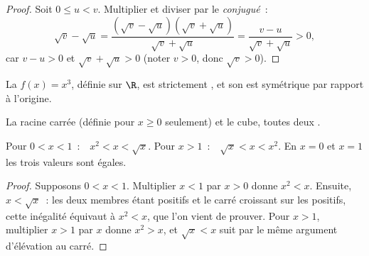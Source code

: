 \begin{proof}
Soit $0 \leq u < v$. Multiplier et diviser par le
\emph{conjugué}~:
\[
\sqrt v - \sqrt u
= \frac{(\sqrt v - \sqrt u)(\sqrt v + \sqrt u)}{\sqrt v + \sqrt u}
= \frac{v - u}{\sqrt v + \sqrt u} > 0,
\]
car $v - u > 0$ et $\sqrt v + \sqrt u > 0$ (noter $v > 0$, donc
$\sqrt v > 0$).
\end{proof}

\begin{proposition}\label{prop:g10:reffunc:cube}
La  $f(x) = x^3$, définie sur $\R$, est strictement ,
et son  est symétrique par rapport à l'origine.
\end{proposition}
\admitted

\begin{omfigure}
\hfill
{}

{\small La racine carrée (définie pour $x \geq 0$ seulement) et le cube,
toutes deux .}
\end{omfigure}

\begin{proposition}\label{prop:g10:reffunc:compare}
Pour $0 < x < 1$~:\ \ $x^2 < x < \sqrt x$.\quad
Pour $x > 1$~:\ \ $\sqrt x < x < x^2$.\quad
En $x = 0$ et $x = 1$ les trois valeurs sont égales.
\end{proposition}

\begin{proof}
Supposons $0 < x < 1$. Multiplier $x < 1$ par $x > 0$ donne $x^2 < x$.
Ensuite, $x < \sqrt x$~: les deux membres étant positifs et le carré
croissant sur les positifs, cette inégalité équivaut à $x^2 < x$, que
l'on vient de prouver. Pour $x > 1$, multiplier $x > 1$ par $x$ donne
$x^2 > x$, et $\sqrt x < x$ suit par le même argument d'élévation au
carré.
\end{proof}

